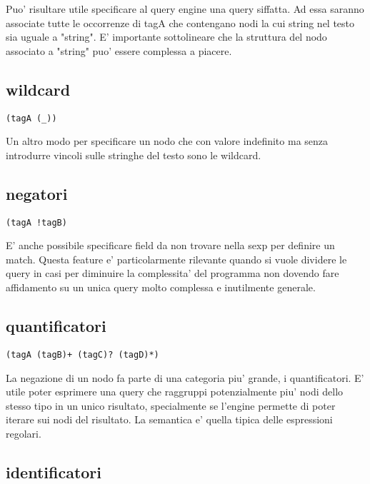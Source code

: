 Puo' risultare utile specificare al query engine una query siffatta.
Ad essa saranno associate tutte le occorrenze di tagA che contengano nodi la cui string nel testo sia uguale a "string".
E' importante sottolineare che la struttura del nodo associato a "string" puo' essere complessa a piacere.

\subsection{wildcard}

\begin{Verbatim}[samepage=true]
(tagA (_))
\end{Verbatim}

Un altro modo per specificare un nodo che con valore indefinito ma senza introdurre vincoli sulle stringhe del testo sono le wildcard.

\subsection{negatori}

\begin{Verbatim}[samepage=true]
(tagA !tagB)
\end{Verbatim}

E' anche possibile specificare field da non trovare nella sexp per definire un match.
Questa feature e' particolarmente rilevante quando si vuole dividere le query in casi per diminuire la complessita' del programma non dovendo fare affidamento su un unica query molto complessa e inutilmente generale.

\subsection{quantificatori}

\begin{Verbatim}[samepage=true]
(tagA (tagB)+ (tagC)? (tagD)*)
\end{Verbatim}

La negazione di un nodo fa parte di una categoria piu' grande, i quantificatori.
E' utile poter esprimere una query che raggruppi potenzialmente piu' nodi dello stesso tipo in un unico risultato, specialmente se l'engine permette di poter iterare sui nodi del risultato.
La semantica e' quella tipica delle espressioni regolari.

\subsection{identificatori}


